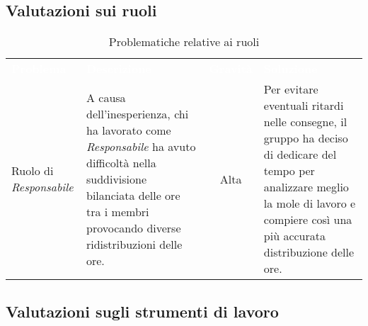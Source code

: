 \subsection{Valutazioni sui ruoli}

\begin{table}[H]
\caption{Problematiche relative ai ruoli}
\begin{center}
\begin{tabular}{ C{2.5cm} L{5cm} c L{5.5cm} }
\textcolor{white}{\textbf{Problema}} & \centerline{\textcolor{white}{\textbf{Descrizione}}} & \textcolor{white}{\textbf{Gravità}} & \centerline{\textcolor{white}{\textbf{Soluzione}}}\\
Ruolo di \textit{Responsabile} & A causa dell'inesperienza, chi ha lavorato come \textit{Responsabile} ha avuto difficoltà nella suddivisione bilanciata delle ore tra i membri provocando diverse ridistribuzioni delle ore. & Alta & Per evitare eventuali ritardi nelle consegne, il gruppo ha deciso di dedicare del tempo per analizzare meglio la mole di lavoro e compiere così una più accurata distribuzione delle ore. \\
\end{tabular}
\end{center}
\end{table}
\pagebreak
\subsection{Valutazioni sugli strumenti di lavoro}

